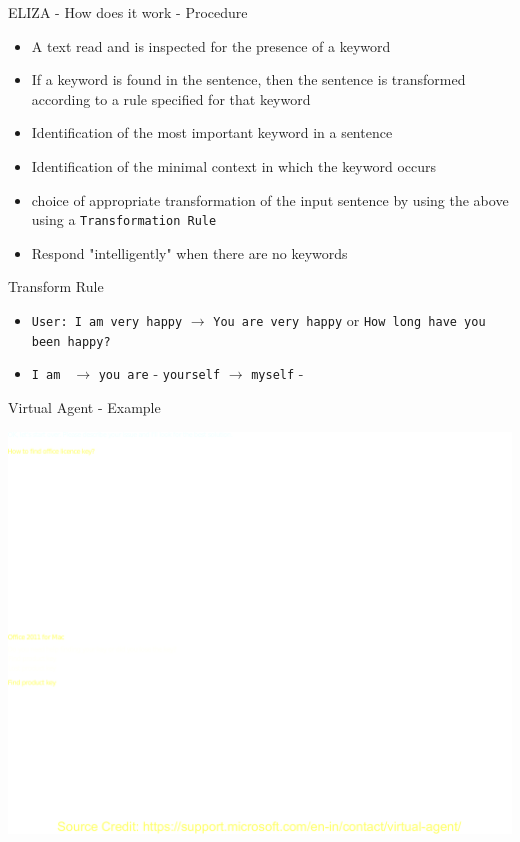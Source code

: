 \begin{frame}[fragile]{ELIZA - How does it work - Procedure}
\begin{itemize}
	\item A text read and is inspected for the presence of a keyword
	\item If a keyword is found in the sentence, then the sentence is transformed according to a rule specified for that keyword
    \item Identification of the most important keyword in a sentence
    \item Identification of the minimal context in which the keyword occurs
    \item choice of appropriate transformation of the input sentence by using the above using a \verb|Transformation Rule|
    \item Respond "intelligently" when there are no keywords
\end{itemize}
\begin{block}{Transform Rule}

  \begin{itemize}
      \item   \verb|User: I am very happy| $\rightarrow$ \verb|You are very happy| or \verb|How long have you been happy?|
      \item \verb|I am | $\rightarrow$ \verb|you are| - \verb|yourself| $\rightarrow$ \verb|myself| -
  \end{itemize}

\end{block}

\end{frame}

\begin{frame}{Virtual Agent - Example}
\begin{center}
	\includegraphics[width=0.7\linewidth]{"./Images/Virtual Agent - Microsoft SupportV2"}
\end{center}
\end{frame}

